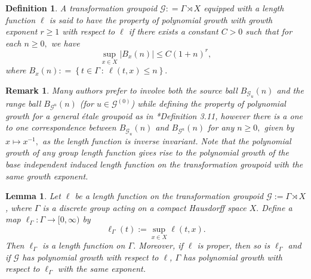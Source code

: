 \documentclass[a4paper,11pt,reqno]{amsart}
\theoremstyle{plain}
\newtheorem{lem}[thm]{Lemma}
\newtheorem{defn}[thm]{Definition}
\newtheorem{rem}[thm]{Remark}
\theoremstyle{mainthmstyle}
\theoremstyle{named}
\numberwithin{equation}{section}
\begin{document}
\begin{defn}
A transformation groupoid $\mathcal G : = \Gamma \rtimes X$ equipped with a length function $\ell$ is said to have the property of polynomial growth with growth exponent $r \geq 1$ with respect to $\ell$ if there exists a constant $C > 0$ such that for each $n \geq 0,$ we have 
$$\sup\limits_{x \in X} \left \lvert B_x (n) \right \rvert \leq C (1 + n)^{r},$$
where $B_x (n) : = \left \{t \in \Gamma\ :\ \ell (t, x) \leq n \right \}.$
\end{defn}
\begin{rem}
Many authors prefer to involve both the source ball $B_{\mathcal G_u} (n)$ and the range ball $B_{\mathcal G^{u}} (n)$ (for $u \in \mathcal G^{(0)}$) while defining the property of polynomial growth for a general \'etale groupoid as in \cite{austad2024polynomial}*{Definition 3.11}, however there is a one to one correspondence between $B_{\mathcal G_u} (n)$ and $B_{\mathcal G^{u}} (n)$ for any $n \geq 0,$ given by $x \mapsto x^{-1},$ as the length function is inverse invariant. Note that the polynomial growth of any group length function gives rise to the polynomial growth of the base independent induced length function on the transformation groupoid with the same growth exponent.
\end{rem}

\begin{lem} \label{induced length}
Let $\ell$ be a length function on the transformation groupoid $\mathcal{G} := \Gamma \rtimes X$, where $\Gamma$ is a discrete group acting on a compact Hausdorff space $X.$ Define a map $\ell_{\Gamma} \colon \Gamma \longrightarrow [0, \infty)$ by 
\[ \ell_{\Gamma}(t) := \sup_{x \in X} \ell(t, x). \]
Then $\ell_{\Gamma}$ is a length function on $\Gamma$. Moreover, if $\ell$ is proper, then so is $\ell_{\Gamma}$ and if $\mathcal{G}$ has polynomial growth with respect to $\ell$, $\Gamma$ has polynomial growth with respect to $\ell_{\Gamma}$ with the same exponent.
\end{lem}
\end{document}

